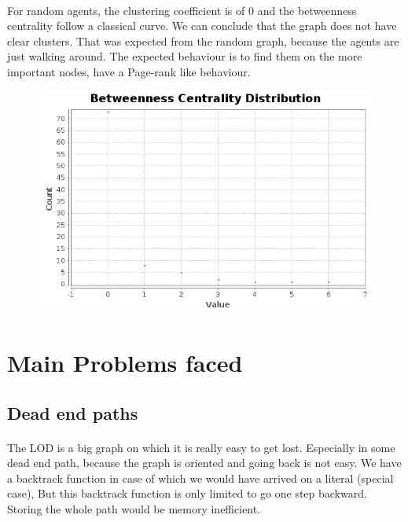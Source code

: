 \documentclass{article}
\begin{document}
		\paragraph{}
			For random agents, the clustering coefficient is of $0$ and the betweenness centrality follow a classical curve.
			We can conclude that the graph does not have clear clusters.
			That was expected from the random graph, because the agents are just walking around.
			The expected behaviour is to find them on the more important nodes, have a Page-rank like behaviour.
		\begin{figure}[!h]
			\includegraphics[width=1\textwidth]{dh_betweenness_centrality_random}
		\end{figure}
		
\section{Main Problems faced}
	\subsection{Dead end paths}
		\paragraph{}
			The LOD is a big graph on which it is really easy to get lost.
			Especially in some dead end path, because the graph is oriented and going back is not easy.
			We have a backtrack function in case of which we would have arrived on a literal (special case),
			But this backtrack function is only limited to go one step backward.
			Storing the whole path would be memory inefficient.
\end{document}
